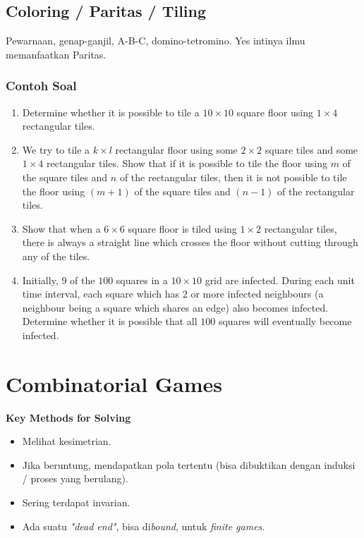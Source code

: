 \documentclass[12pt]{scrartcl}
\begin{document}
\subsection{Coloring / Paritas / Tiling}
Pewarnaan, genap-ganjil, A-B-C, domino-tetromino. Yes intinya ilmu memanfaatkan Paritas.
\subsubsection{Contoh Soal}
\begin{enumerate}
    \item Determine whether it is possible to tile a $10 \times 10$ square floor using $1 \times 4$ rectangular tiles.

\item We try to tile a $k \times l$ rectangular floor using some $2 \times 2$ square tiles and some $1 \times 4$ rectangular tiles. Show that if it is possible to tile the floor using $m$ of the square tiles and $n$ of the rectangular tiles, then it is not possible to tile the floor using $(m + 1)$ of the square tiles and $(n - 1)$ of the rectangular tiles.

\item Show that when a $6 \times 6$ square floor is tiled using $1 \times 2$ rectangular tiles, there is always a straight line which crosses the floor without cutting through any of the tiles.

\item Initially, $9$ of the $100$ squares in a $10 \times 10$ grid are infected. During each unit time interval, each square which has $2$ or more infected neighbours (a neighbour being a square which shares an edge) also becomes infected. Determine whether it is possible that all $100$ squares will eventually become infected.
\end{enumerate}

\section{Combinatorial Games}
\textbf{Key Methods for Solving}
\begin{itemize}
    \item Melihat kesimetrian.
    \item Jika beruntung, mendapatkan pola tertentu (bisa dibuktikan dengan induksi / proses yang berulang).
    \item Sering terdapat invarian.
    \item Ada suatu \textit{"dead end"}, bisa di\textit{bound}, untuk \textit{finite games}.
\end{itemize}
\end{document}
